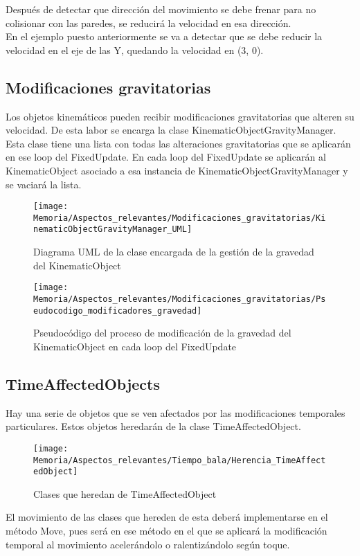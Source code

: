 Después de detectar que dirección del movimiento se debe frenar para no colisionar con las paredes, se reducirá la velocidad en esa dirección.\\
En el ejemplo puesto anteriormente se va a detectar que se debe reducir la velocidad en el eje de las Y, quedando la velocidad en (3, 0).

\subsection{Modificaciones gravitatorias}
Los objetos kinemáticos pueden recibir modificaciones gravitatorias que alteren su velocidad. De esta labor se encarga la clase KinematicObjectGravityManager.\\
Esta clase tiene una lista con todas las alteraciones gravitatorias que se aplicarán en ese loop del FixedUpdate. En cada loop del FixedUpdate se aplicarán al KinematicObject asociado a esa instancia de KinematicObjectGravityManager y se vaciará la lista.

\begin{figure}[h]
\centering
\texttt{[image: Memoria/Aspectos\_relevantes/Modificaciones\_gravitatorias/KinematicObjectGravityManager\_UML]}
\caption{Diagrama UML de la clase encargada de la gestión de la gravedad del KinematicObject}
\end{figure}

\begin{figure}[h]
\centering
\texttt{[image: Memoria/Aspectos\_relevantes/Modificaciones\_gravitatorias/Pseudocodigo\_modificadores\_gravedad]}
\caption{Pseudocódigo del proceso de modificación de la gravedad del KinematicObject en cada loop del FixedUpdate}
\end{figure}

\subsection{TimeAffectedObjects}
Hay una serie de objetos que se ven afectados por las modificaciones temporales particulares. Estos objetos heredarán de la clase TimeAffectedObject. 

\begin{figure}[h]
\texttt{[image: Memoria/Aspectos\_relevantes/Tiempo\_bala/Herencia\_TimeAffectedObject]}
\caption{Clases que heredan de TimeAffectedObject}
\end{figure}

El movimiento de las clases que hereden de esta deberá implementarse en el método Move, pues será en ese método en el que se aplicará la modificación temporal al movimiento acelerándolo o ralentizándolo según toque.

